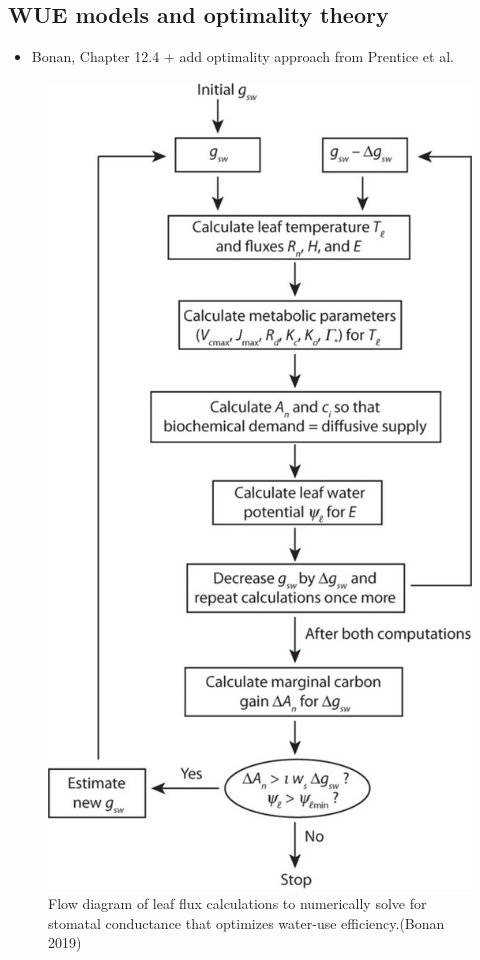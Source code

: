 \documentclass[
  oneside]{book}
\providecommand{\tightlist}{%
  \setlength{\itemsep}{0pt}\setlength{\parskip}{0pt}}
\begin{document}
\hypertarget{wue-models-and-optimality-theory}{%
\subsection{WUE models and optimality theory}\label{wue-models-and-optimality-theory}}

\begin{itemize}
\tightlist
\item
  Bonan, Chapter 12.4 + add optimality approach from Prentice et al.
\end{itemize}

\begin{figure}

{\centering \includegraphics[width=0.8\linewidth]{figures/chap2/optimality} 

}

\caption{Flow diagram of leaf flux calculations to numerically solve for stomatal conductance that optimizes water-use efficiency.(Bonan 2019)}\label{fig:f215}
\end{figure}
\end{document}
